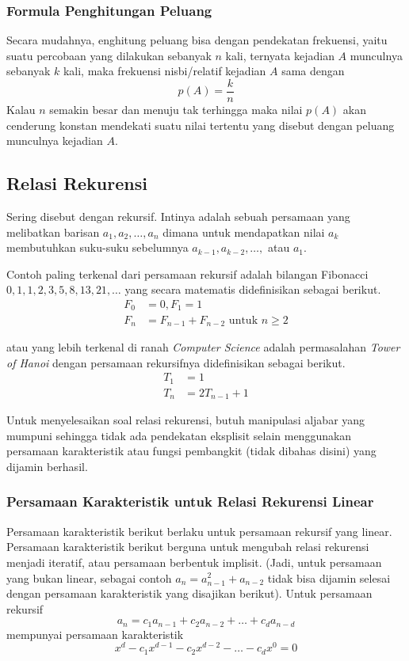 \subsubsection{Formula Penghitungan Peluang}
Secara mudahnya, enghitung peluang bisa dengan pendekatan frekuensi, yaitu suatu percobaan yang dilakukan sebanyak $n$ kali, ternyata kejadian $A$ munculnya sebanyak $k$ kali, maka frekuensi nisbi/relatif kejadian $A$ sama dengan 
$$p(A)=\dfrac{k}{n}$$
Kalau $n$ semakin besar dan menuju tak terhingga maka nilai $p(A)$ akan cenderung konstan mendekati suatu nilai tertentu yang disebut dengan peluang munculnya kejadian $A$.

\subsection{Relasi Rekurensi}
Sering disebut dengan rekursif. Intinya adalah sebuah persamaan yang melibatkan barisan $a_1, a_2, \dots , a_n$ dimana untuk mendapatkan nilai $a_k$ membutuhkan suku-suku sebelumnya $a_{k-1}, a_{k-2}, \dots,$ atau $a_1$. 

Contoh paling terkenal dari persamaan rekursif adalah bilangan Fibonacci $0,1,1,2,3,5,8,13,21,\dots$ yang secara matematis didefinisikan sebagai berikut.
\begin{align*}
    F_0 &= 0, F_1 = 1\\
    F_n &= F_{n-1}+F_{n-2} \text{ untuk } n \ge 2
\end{align*}

atau yang lebih terkenal di ranah \textit{Computer Science} adalah permasalahan \textit{Tower of Hanoi} dengan persamaan rekursifnya didefinisikan sebagai berikut.
\begin{align*}
    T_1 &= 1 \\
    T_n &= 2T_{n-1}+1
\end{align*}

Untuk menyelesaikan soal relasi rekurensi, butuh manipulasi aljabar yang mumpuni sehingga tidak ada pendekatan eksplisit selain menggunakan persamaan karakteristik atau fungsi pembangkit (tidak dibahas disini) yang dijamin berhasil.

\subsubsection{Persamaan Karakteristik untuk Relasi Rekurensi Linear}
Persamaan karakteristik berikut berlaku untuk persamaan rekursif yang linear. Persamaan karakteristik berikut berguna untuk mengubah relasi rekurensi menjadi iteratif, atau persamaan berbentuk implisit. (Jadi, untuk persamaan yang bukan linear, sebagai contoh $a_n = a_{n-1}^2 + a_{n-2}$ tidak bisa dijamin selesai dengan persamaan karakteristik yang disajikan berikut).
Untuk persamaan rekursif
$$a_n = c_1a_{n-1}+c_2a_{n-2}+\dots+c_da_{n-d}$$
mempunyai persamaan karakteristik
$$x^d-c_1x^{d-1}-c_2x^{d-2}-\dots-c_dx^0=0$$

